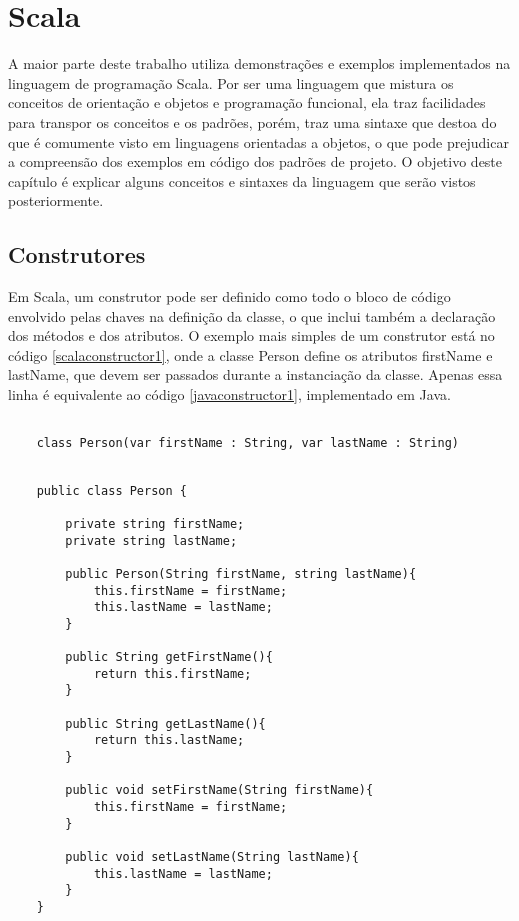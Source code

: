 \chapter{Scala}

A maior parte deste trabalho utiliza demonstrações 
e exemplos implementados na linguagem de programação Scala. 
Por ser uma linguagem que mistura os conceitos de 
orientação e objetos e programação funcional, ela traz 
facilidades para transpor os conceitos e os padrões, porém, 
traz uma sintaxe que destoa do que é comumente visto 
em linguagens orientadas a objetos, o que pode prejudicar 
a compreensão dos exemplos em código dos padrões de projeto. 
O objetivo deste capítulo é explicar alguns conceitos e 
sintaxes da linguagem que serão vistos posteriormente.


\section{Construtores}

Em Scala, um construtor pode ser definido como todo o 
bloco de código envolvido pelas chaves na definição da 
classe, o que inclui também a declaração dos métodos 
e dos atributos\cite{wampler2021}. O exemplo mais 
simples de um construtor 
está no código \ref{scalaconstructor1}, onde a classe 
Person define os atributos firstName e lastName, que 
devem ser passados durante a instanciação da classe. 
Apenas essa linha é equivalente ao código \ref{javaconstructor1}, 
implementado em Java.

\begin{lstlisting}[caption={Construtor Simples em Scala},label=scalaconstructor1]

    class Person(var firstName : String, var lastName : String)

\end{lstlisting}


\begin{lstlisting}[caption={Construtor Simples em Java},label=javaconstructor1]

    public class Person {
        
        private string firstName;
        private string lastName;
        
        public Person(String firstName, string lastName){
            this.firstName = firstName;
            this.lastName = lastName;
        }
        
        public String getFirstName(){
            return this.firstName;
        }
        
        public String getLastName(){
            return this.lastName;
        }
        
        public void setFirstName(String firstName){
            this.firstName = firstName;
        }
        
        public void setLastName(String lastName){
            this.lastName = lastName;
        }
    }

\end{lstlisting}

